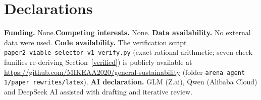 \documentclass[10pt,twocolumn]{article}
\theoremstyle{definition}
\begin{document}
\section*{Declarations}

\textbf{Funding.} None.\quad \textbf{Competing interests.} None.\quad
\textbf{Data availability.} No external data were used.\quad
\textbf{Code availability.} The verification script
\texttt{paper2\_viable\_selector\_v1\_verify.py} (exact rational arithmetic; seven check
families re-deriving Section~\ref{verified}) is publicly available at
\url{https://github.com/MIKEAA2020/general-sustainability} (folder
\texttt{arena agent 1/paper rewrites/latex}).\quad
\textbf{AI declaration.} GLM (Z.ai), Qwen (Alibaba Cloud) and DeepSeek AI
assisted with drafting and iterative review.
\end{document}
